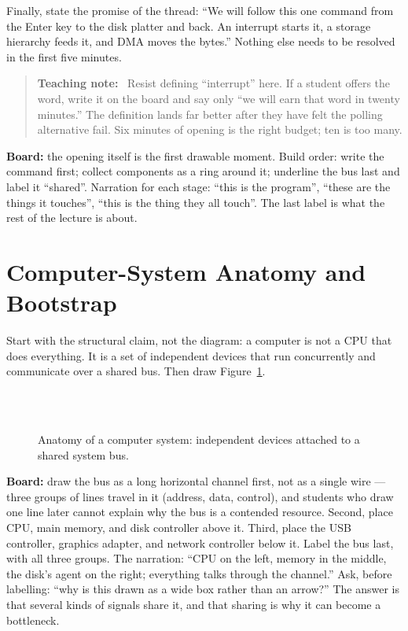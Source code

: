 \documentclass[11pt]{article}
\newenvironment{teachingaside}{\begin{quote}\small\color{primary-gold}\textbf{Teaching note:}\ }{\end{quote}}
\begin{document}
Finally, state the promise of the thread: ``We will follow this one command from
the Enter key to the disk platter and back. An interrupt starts it, a storage
hierarchy feeds it, and DMA moves the bytes.'' Nothing else needs to be resolved
in the first five minutes.

\begin{teachingaside}
Resist defining ``interrupt'' here. If a student offers the word, write it on
the board and say only ``we will earn that word in twenty minutes.'' The
definition lands far better after they have felt the polling alternative fail.
Six minutes of opening is the right budget; ten is too many.
\end{teachingaside}

\textbf{Board:} the opening itself is the first drawable moment. Build order:
write the command first; collect components as a ring around it; underline the
bus last and label it ``shared''. Narration for each stage: ``this is the
program'', ``these are the things it touches'', ``this is the thing they all
touch''. The last label is what the rest of the lecture is about.

\section{Computer-System Anatomy and Bootstrap}

Start with the structural claim, not the diagram: a computer is not a CPU that
does everything. It is a set of independent devices that run concurrently and
communicate over a shared bus. Then draw Figure~\ref{fig:anatomy}.

\begin{figure}[ht]
\centering
\small
{}\hfill
{}\hfill
{}\\[0.3em]
\\[0.3em]
\hfill
{}\hfill
{}
\caption{Anatomy of a computer system: independent devices attached to a shared
system bus.}
\label{fig:anatomy}
\end{figure}

\textbf{Board:} draw the bus as a long horizontal channel first, not as a single
wire --- three groups of lines travel in it (address, data, control), and
students who draw one line later cannot explain why the bus is a contended
resource. Second, place CPU, main memory, and disk controller above it. Third,
place the USB controller, graphics adapter, and network controller below it.
Label the bus last, with all three groups. The narration: ``CPU on the left,
memory in the middle, the disk's agent on the right; everything talks through
the channel.'' Ask, before labelling: ``why is this drawn as a wide box rather
than an arrow?'' The answer is that several kinds of signals share it, and that
sharing is why it can become a bottleneck.
\end{document}

